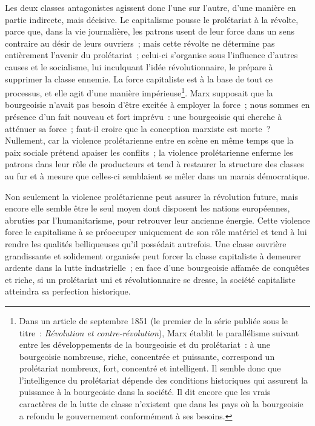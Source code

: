 \documentclass[french,twoside]{book} %
\begin{document}
Les deux classes antagonistes agissent donc l’une sur l’autre, d’une manière en partie indirecte, mais décisive. Le capitalisme pousse le prolétariat à la révolte, parce que, dans la vie journalière, les patrons usent de leur force dans un sens contraire au désir de leurs ouvriers ; mais cette révolte ne détermine pas entièrement l’avenir du prolétariat ; celui-ci s’organise sous l’influence d’autres causes et le socialisme, lui inculquant l’idée  révolutionnaire, le prépare à supprimer la classe ennemie. La force capitaliste est à la base de tout ce processus, et elle agit d’une manière impérieuse\footnote{ \noindent Dans un article de septembre 1851 (le premier de la série publiée sous le titre : \emph{Révolution et contre-révolution}), Marx établit le parallélisme suivant entre les développements de la bourgeoisie et du prolétariat : à une bourgeoisie nombreuse, riche, concentrée et puissante, correspond un prolétariat nombreux, fort, concentré et intelligent. Il semble donc que l’intelligence du prolétariat dépende des conditions historiques qui assurent la puissance à la bourgeoisie dans la société. Il dit encore que les vrais caractères de la lutte de classe n’existent que dans les pays où la bourgeoisie a refondu le gouvernement conformément à ses besoins.
 }. Marx supposait que la bourgeoisie n’avait pas besoin d’être excitée à employer la force ; nous sommes en présence d’un fait nouveau et fort imprévu : une bourgeoisie qui cherche à atténuer sa force ; faut-il croire que la conception marxiste est morte ? Nullement, car la violence prolétarienne entre en scène en même temps que la paix sociale prétend apaiser les conflits ; la violence prolétarienne enferme les patrons dans leur rôle de producteurs et tend à restaurer la structure des classes au fur et à mesure que celles-ci semblaient se mêler dans un marais démocratique.\par
Non seulement la violence prolétarienne peut assurer la révolution future, mais encore elle semble être le seul moyen dont disposent les nations européennes, abruties par l’humanitarisme, pour retrouver leur ancienne énergie. Cette violence force le capitalisme à se préoccuper uniquement de son rôle matériel et tend à lui rendre les qualités belliqueuses qu’il possédait autrefois. Une classe  ouvrière grandissante et solidement organisée peut forcer la classe capitaliste à demeurer ardente dans la lutte industrielle ; en face d’une bourgeoisie affamée de conquêtes et riche, si un prolétariat uni et révolutionnaire se dresse, la société capitaliste atteindra sa perfection historique.\par
\end{document}
